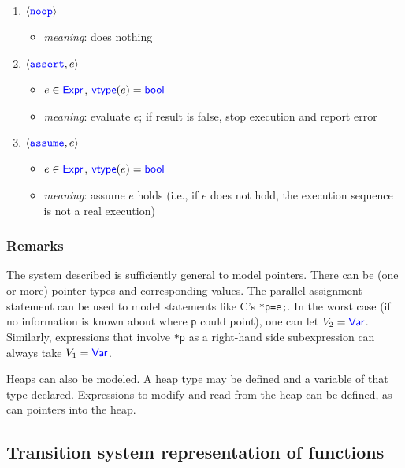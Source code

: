 \documentclass[11pt]{article}
\begin{document}
\begin{enumerate}
\begin{itemize}
  \end{itemize}
\item $\langle\texttt{\textcolor{blue}{noop}}\rangle$
  \begin{itemize}
  \item \emph{meaning}: does nothing
  \end{itemize}
\item $\langle\texttt{\textcolor{blue}{assert}}, e\rangle$
  \begin{itemize}
  \item $e\in\textsf{\textcolor{blue}{\textup{Expr}}}$, $\textsf{\textcolor{blue}{\textup{vtype}}}(e)=\textsf{\textcolor{blue}{\textup{bool}}}$
  \item \emph{meaning}: evaluate $e$; if result is false, stop
    execution and report error
  \end{itemize}
\item  $\langle\texttt{\textcolor{blue}{assume}}, e\rangle$
  \begin{itemize}
  \item $e\in\textsf{\textcolor{blue}{\textup{Expr}}}$, $\textsf{\textcolor{blue}{\textup{vtype}}}(e)=\textsf{\textcolor{blue}{\textup{bool}}}$
  \item \emph{meaning}: assume $e$ holds (i.e., if $e$ does not hold,
    the execution sequence is not a real execution)
  \end{itemize}
\end{enumerate}

\subsubsection{Remarks}

The system described is sufficiently general to model pointers. There
can be (one or more) pointer types and corresponding values.  The
parallel assignment statement can be used to model statements like
C's \texttt{*p=e;}.  In the worst case (if no information is known
about where \texttt{p} could point), one can let $V_2=\textsf{\textcolor{blue}{\textup{Var}}}$.
Similarly, expressions that involve \texttt{*p} as a right-hand
side subexpression can always take $V_1=\textsf{\textcolor{blue}{\textup{Var}}}$.

Heaps can also be modeled.  A heap type may be defined and a variable
of that type declared.  Expressions to modify and read from the heap
can be defined, as can pointers into the heap.


\subsection{Transition system representation of functions}
\label{sec:gts}
\end{document}
